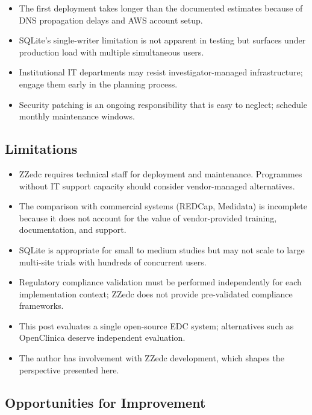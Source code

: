 \documentclass[
  letterpaper,
  DIV=11,
  numbers=noendperiod]{scrartcl}
\providecommand{\tightlist}{%
  \setlength{\itemsep}{0pt}\setlength{\parskip}{0pt}}
\begin{document}
\begin{itemize}
\tightlist
\item
  The first deployment takes longer than the documented estimates
  because of DNS propagation delays and AWS account setup.
\item
  SQLite's single-writer limitation is not apparent in testing but
  surfaces under production load with multiple simultaneous users.
\item
  Institutional IT departments may resist investigator-managed
  infrastructure; engage them early in the planning process.
\item
  Security patching is an ongoing responsibility that is easy to
  neglect; schedule monthly maintenance windows.
\end{itemize}

\subsection{Limitations}\label{limitations}

\begin{itemize}
\tightlist
\item
  ZZedc requires technical staff for deployment and maintenance.
  Programmes without IT support capacity should consider vendor-managed
  alternatives.
\item
  The comparison with commercial systems (REDCap, Medidata) is
  incomplete because it does not account for the value of
  vendor-provided training, documentation, and support.
\item
  SQLite is appropriate for small to medium studies but may not scale to
  large multi-site trials with hundreds of concurrent users.
\item
  Regulatory compliance validation must be performed independently for
  each implementation context; ZZedc does not provide pre-validated
  compliance frameworks.
\item
  This post evaluates a single open-source EDC system; alternatives such
  as OpenClinica deserve independent evaluation.
\item
  The author has involvement with ZZedc development, which shapes the
  perspective presented here.
\end{itemize}

\subsection{Opportunities for
Improvement}\label{opportunities-for-improvement}
\end{document}
